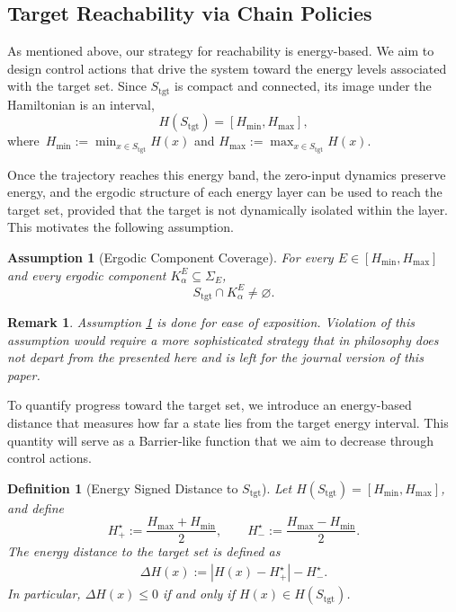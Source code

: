 \documentclass[letterpaper, 10 pt, conference]{ieeeconf}
\newtheorem{assumption}{Assumption}
\newtheorem{definition}{Definition}
\newtheorem{remark}{Remark}
\newcommand{\tgt}{\mathrm{tgt}}
\begin{document}
\subsection{Target Reachability via Chain Policies}
\label{sec:general reachability}

As mentioned above, our strategy for reachability is energy-based. We aim to design control actions that drive the system toward the energy levels associated with the target set. 
Since $S_{\tgt}$ is compact and connected, its image under the Hamiltonian is an interval,
\[
H(S_{\tgt}) = [H_{\min}, H_{\max}], 
\]
where~$H_{\min}\!\!:=\!\min_{x \in S_{\tgt}}\!\! H(x)$ and $H_{\max}\!\!:=\!\max_{x \in S_{\tgt}}\!\! H(x).$

Once the trajectory reaches this energy band, the zero-input dynamics preserve energy, and the ergodic structure of each energy layer can be used to reach the target set, provided that the target is not dynamically isolated within the layer.
This motivates the following assumption.

\begin{assumption}[Ergodic Component Coverage]
\label{ass_target_set}
For every $E \in [H_{\min}, H_{\max}]$ and every ergodic component $K_\alpha^E \subseteq \Sigma_E$,
\[
S_{\tgt} \cap K_\alpha^E \neq \varnothing.
\]
\end{assumption}

\begin{remark}
    Assumption \ref{ass_target_set} is done for ease of exposition. Violation of this assumption would require a more sophisticated strategy that in philosophy does not depart from the presented here and is left for the journal version of this paper.
\end{remark}

To quantify progress toward the target set, we introduce an energy-based distance that measures how far a state lies from the target energy interval. This quantity will serve as a Barrier-like function that we aim to decrease through control actions.

\begin{definition}[Energy Signed Distance to $S_\mathrm{\tgt}$]
\label{def_energy_distance}
Let $H(S_{\tgt}) = [H_{\min}, H_{\max}]$, and define
\[
H^\star_+ := \frac{H_{\max}+H_{\min}}{2}, 
\qquad 
H^\star_- := \frac{H_{\max}-H_{\min}}{2}.
\]
The energy distance to the target set is defined as
\begin{align*}
\Delta H(x) := |H(x)-H^\star_+| - H^\star_-.
\end{align*}
In particular, $\Delta H(x) \le 0$ if and only if $H(x) \in H(S_\mathrm{\tgt})$.
\end{definition}
\end{document}
